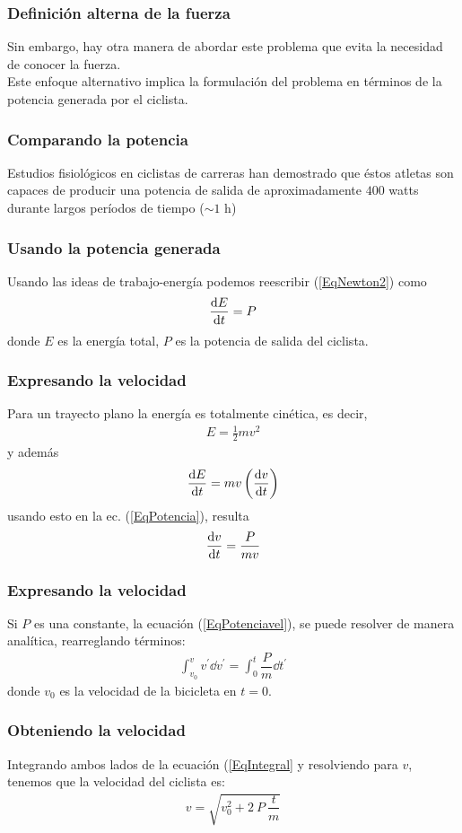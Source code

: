 \begin{frame}
\frametitle{Definición alterna de la fuerza}
Sin embargo, hay otra manera de abordar este problema que evita la necesidad de conocer la fuerza.
\\
\medskip
Este enfoque alternativo implica la formulación del problema en términos de la potencia generada por el ciclista.
\end{frame}
\begin{frame}
\frametitle{Comparando la potencia}
Estudios fisiológicos en ciclistas de carreras han demostrado que éstos atletas son capaces de producir una potencia de salida de aproximadamente $400$ watts durante largos períodos de tiempo ($\sim 1$ h)
\end{frame}
\begin{frame}
\frametitle{Usando la potencia generada}
Usando las ideas de trabajo-energía podemos reescribir (\ref{EqNewton2}) como
\begin{align}
\dv{E}{t} = P
\label{EqPotencia}
\end{align}
donde $E$ es la energía total, $P$ es la potencia de salida del ciclista. 
\end{frame}
\begin{frame}
\frametitle{Expresando la velocidad}
Para un trayecto plano la energía es totalmente cinética, es decir,
\begin{align*}
E = \frac{1}{2} m v^{2}
\end{align*}
y además
\begin{align*}
\dv{E}{t} = mv  \left( \dv{v}{t} \right)
\end{align*}
\pause
usando esto en la ec. (\ref{EqPotencia}), resulta
\begin{align}
\dv{v}{t} = \dfrac{P}{mv}
\label{EqPotenciavel}
\end{align}
\end{frame}
\begin{frame}
\frametitle{Expresando la velocidad}
Si $P$ es una constante, la ecuación (\ref{EqPotenciavel}), se puede resolver de manera analítica, rearreglando términos:
\begin{align}
\int_{v_{0}}^{v} v^{\prime} \dd{v^{\prime}} = \int_{0}^{t} \dfrac{P}{m} \dd{t^{\prime}}
\label{EqIntegral}
\end{align}
donde $v_{0}$ es la velocidad de la bicicleta en $t=0$. 
\end{frame}
\begin{frame}
\frametitle{Obteniendo la velocidad}
Integrando ambos lados de la ecuación (\ref{EqIntegral} y resolviendo para $v$, tenemos que la velocidad del ciclista es:
\begin{align}
v = \sqrt{v_{0}^{2} + 2 \: P \: \dfrac{t}{m}}
\label{Eqvres}
\end{align}
\end{frame}

